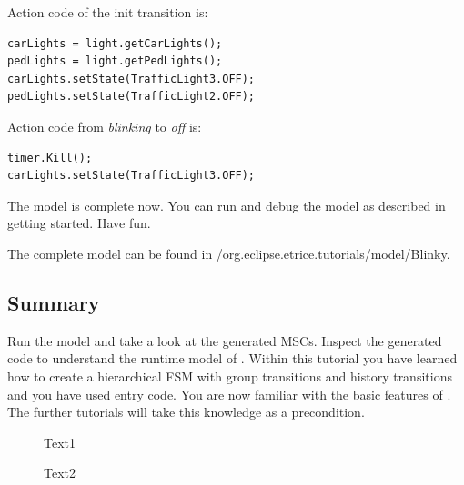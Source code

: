 Action code of the init transition is:

\begin{verbatim}
carLights = light.getCarLights();
pedLights = light.getPedLights();
carLights.setState(TrafficLight3.OFF);
pedLights.setState(TrafficLight2.OFF);
\end{verbatim}

Action code from \textit{blinking} to \textit{off} is:

\begin{verbatim}
timer.Kill();
carLights.setState(TrafficLight3.OFF); 
\end{verbatim}

The model is complete now. You can run and debug the model as described in getting started. Have fun.

The complete model can be found in /org.eclipse.etrice.tutorials/model/Blinky.

\subsection{Summary}

Run the model and take a look at the generated MSCs. Inspect the generated code to understand the runtime 
model of \eTrice{}. Within this tutorial you have learned how to create a hierarchical FSM with group 
transitions and history transitions and you have used entry code. You are now familiar with the basic 
features of \eTrice{}. The further tutorials will take this knowledge as a precondition.

\begin{figure}[ht]
\begin{minipage}[b]{0.45\linewidth}
\centering
Text1
\end{minipage}
\hspace{0.5cm}
\begin{minipage}[b]{0.45\linewidth}
\centering
Text2
\end{minipage}
\end{figure}